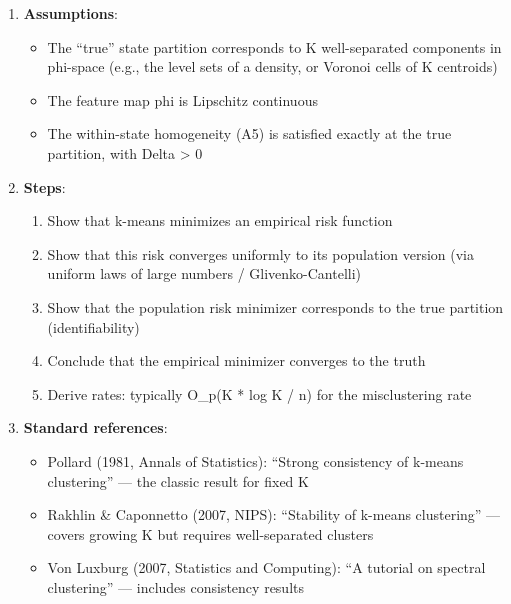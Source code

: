 \documentclass[
  12pt,
]{ctexart}
\providecommand{\tightlist}{%
  \setlength{\itemsep}{0pt}\setlength{\parskip}{0pt}}
\begin{document}
\begin{enumerate}
\def\labelenumi{\arabic{enumi}.}
\tightlist
\item
  \textbf{Assumptions}:

  \begin{itemize}
  \tightlist
  \item
    The ``true'' state partition corresponds to K well-separated
    components in phi-space (e.g., the level sets of a density, or
    Voronoi cells of K centroids)
  \item
    The feature map phi is Lipschitz continuous
  \item
    The within-state homogeneity (A5) is satisfied exactly at the true
    partition, with Delta \textgreater{} 0
  \end{itemize}
\item
  \textbf{Steps}:

  \begin{enumerate}
  \def\labelenumii{\alph{enumii}.}
  \tightlist
  \item
    Show that k-means minimizes an empirical risk function
  \item
    Show that this risk converges uniformly to its population version
    (via uniform laws of large numbers / Glivenko-Cantelli)
  \item
    Show that the population risk minimizer corresponds to the true
    partition (identifiability)
  \item
    Conclude that the empirical minimizer converges to the truth
  \item
    Derive rates: typically O\_p(K * log K / n) for the misclustering
    rate
  \end{enumerate}
\item
  \textbf{Standard references}:

  \begin{itemize}
  \tightlist
  \item
    Pollard (1981, Annals of Statistics): ``Strong consistency of
    k-means clustering'' --- the classic result for fixed K
  \item
    Rakhlin \& Caponnetto (2007, NIPS): ``Stability of k-means
    clustering'' --- covers growing K but requires well-separated
    clusters
  \item
    Von Luxburg (2007, Statistics and Computing): ``A tutorial on
    spectral clustering'' --- includes consistency results
  \end{itemize}
\end{enumerate}
\end{document}
